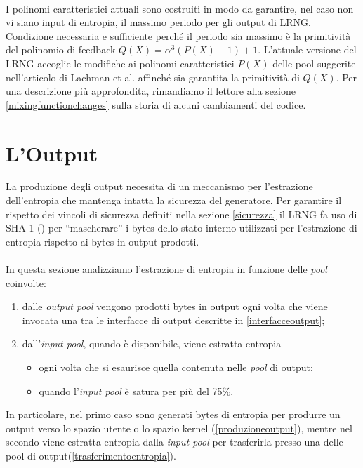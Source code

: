 \documentclass{article}
\begin{document}
 \paragraph{}I polinomi caratteristici attuali sono costruiti in modo da
 garantire, nel caso non vi siano input di entropia, il massimo periodo per gli output di LRNG.
 Condizione necessaria e sufficiente perché il periodo sia massimo è la
 primitività del polinomio di feedback $Q(X)=\alpha^3(P(X)-1)+1$.
 L'attuale versione del LRNG accoglie le modifiche ai polinomi caratteristici
 $P(X)$ delle pool suggerite nell'articolo di Lachman et al. \cite{lach}
 affinché sia garantita la primitività di $Q(X)$. 
 \newline Per una descrizione più approfondita, rimandiamo il lettore alla
 sezione \ref{mixingfunctionchanges} sulla storia di alcuni cambiamenti del
 codice.
 \section{L'Output}
 La produzione degli output necessita di un meccanismo per l'estrazione
 dell'entropia che mantenga intatta la sicurezza del generatore. Per
 garantire il rispetto dei vincoli di sicurezza definiti nella sezione
 \ref{sicurezza} il LRNG fa uso di SHA-1 () per ``mascherare'' i bytes dello
 stato interno utilizzati per l'estrazione di entropia rispetto ai bytes in
 output prodotti.
 \paragraph{}In questa sezione analizziamo l'estrazione di entropia in funzione
 delle \emph{pool} coinvolte:
 \begin{enumerate}
   \item dalle \emph{output pool} vengono prodotti bytes in output ogni
 volta che viene invocata una tra le interfacce di output descritte in
 \ref{interfacceoutput};
 \item dall'\emph{input pool}, quando è disponibile, viene
 estratta entropia 
 \begin{itemize}
   \item ogni volta che si esaurisce quella contenuta nelle \emph{pool} di
   output;
   \item quando l'\emph{input pool} è satura per più del 75\%.
 \end{itemize}
 \end{enumerate}
 In particolare, nel primo caso sono generati bytes di entropia per produrre un
 output verso lo spazio utente o lo spazio kernel (\ref{produzioneoutput}), mentre nel
 secondo viene estratta entropia dalla \emph{input pool} per trasferirla presso
 una delle pool di output(\ref{trasferimentoentropia}).
 
\end{document}

